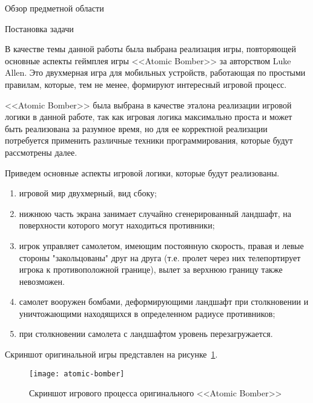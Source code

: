 	\begin{section}{Обзор предметной области}

		\begin{subsection}{Постановка задачи}

			В качестве темы данной работы была выбрана реализация игры, повторяющей основные аспекты геймплея игры <<Atomic Bomber>> за авторством Luke Allen.
			Это двухмерная игра для мобильных устройств, работающая по простыми правилам, которые, тем не менее, формируют интересный игровой процесс.

			<<Atomic Bomber>> была выбрана в качестве эталона реализации игровой логики в данной работе, так как игровая логика максимально проста и может быть реализована за разумное время, но для ее корректной реализации потребуется применить различные техники программирования, которые будут рассмотрены далее.

			Приведем основные аспекты игровой логики, которые будут реализованы.

			\begin{enumerate}
				\item игровой мир двухмерный, вид сбоку;
				\item нижнюю часть экрана занимает случайно сгенерированный ландшафт, на поверхности которого могут находиться противники;
				\item игрок управляет самолетом, имеющим постоянную скорость, правая и левые стороны "закольцованы" друг на друга (т.е. пролет через них телепортирует игрока к противоположной границе), вылет за верхнюю границу также невозможен.
				\item самолет вооружен бомбами, деформирующими ландшафт при столкновении и уничтожающими находящихся в определенном радиусе противников;
				\item при столкновении самолета с ландшафтом уровень перезагружается.
			\end{enumerate}

			Скриншот оригинальной игры представлен на рисунке~\ref{atomic-bomber}.

			\begin{figure}[H]
				\texttt{[image: atomic-bomber]}
				\caption{Скриншот игрового процесса оригинального <<Atomic Bomber>>}
				\label{atomic-bomber}
			\end{figure}
		\end{subsection}


\end{section}
